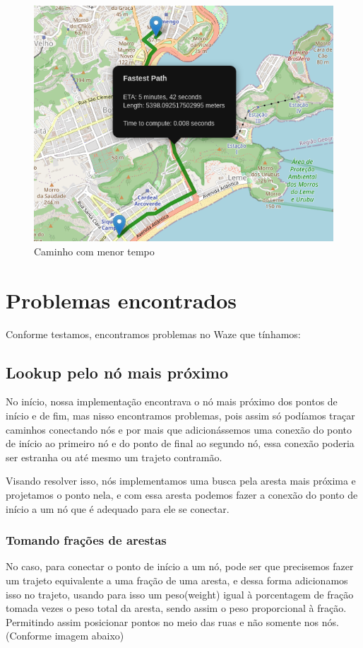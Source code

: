 \documentclass{article}
\begin{document}
\begin{itemize}
\begin{figure}[H]
    \centering
    \includegraphics[scale=0.7]{EDA_path_with_fastest_path.png}
    \caption{Caminho com menor tempo}
    \label{fig:my_label}
\end{figure}

\end{itemize}

\section{Problemas encontrados}

Conforme testamos, encontramos problemas no Waze que tínhamos:
\subsection{Lookup pelo nó mais próximo}
No início, nossa implementação encontrava o nó mais próximo dos pontos de início e de fim, mas nisso encontramos problemas, pois assim só podíamos traçar caminhos conectando nós e por mais que adicionássemos uma conexão do ponto de início ao primeiro nó e do ponto de final ao segundo nó, essa conexão poderia ser estranha ou até mesmo um trajeto contramão.

Visando resolver isso, nós implementamos uma busca pela aresta mais próxima e projetamos o ponto nela, e com essa aresta podemos fazer a conexão do ponto de início a um nó que é adequado para ele se conectar.

\subsubsection{Tomando frações de arestas}
No caso, para conectar o ponto de início a um nó, pode ser que precisemos fazer um trajeto equivalente a uma fração de uma aresta, e dessa forma adicionamos isso no trajeto, usando para isso um peso(weight) igual à porcentagem de fração tomada vezes o peso total da aresta, sendo assim o peso proporcional à fração. Permitindo assim posicionar pontos no meio das ruas e não somente nos nós. (Conforme imagem abaixo)
\end{document}
